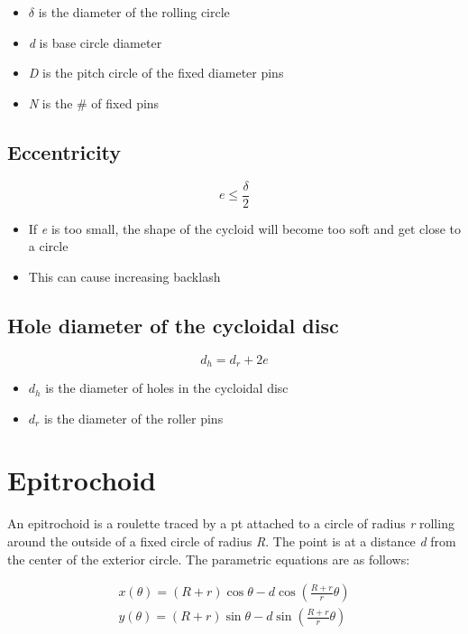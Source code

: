 \documentclass{article}
\begin{document}
\begin{itemize}
    \item \textit{$\delta$} is the diameter of the rolling circle
    \item \textit{d} is base circle diameter
    \item \textit{D} is the pitch circle of the fixed diameter pins
    \item \textit{N} is the \# of fixed pins
\end{itemize}

\subsection{Eccentricity}
\begin{equation}
    e \le \frac{\delta}{2}
\end{equation}

\begin{itemize}
    \item If \textit{e} is too small, the shape of the cycloid will become too soft and get close to a circle
    \item This can cause increasing backlash
\end{itemize}

\subsection{Hole diameter of the cycloidal disc}
\begin{equation}
    d_h = d_r +2e
\end{equation}

\begin{itemize}
    \item \textit{$d_h$} is the diameter of holes in the cycloidal disc
    \item \textit{$d_r$} is the diameter of the roller pins 
\end{itemize}

\section{Epitrochoid}
An epitrochoid is a roulette traced by a pt attached to a circle of radius \textit{r}
rolling around the outside of a fixed circle of radius \textit{R}. The point is at a distance
\textit{d} from the center of the exterior circle. The parametric equations are as follows:

\begin{align}
    x(\theta) = (R+r)\cos\theta - d\cos(\frac{R+r}{r}\theta) \\
    y(\theta) = (R+r)\sin\theta - d\sin(\frac{R+r}{r}\theta)
\end{align}
\end{document}
